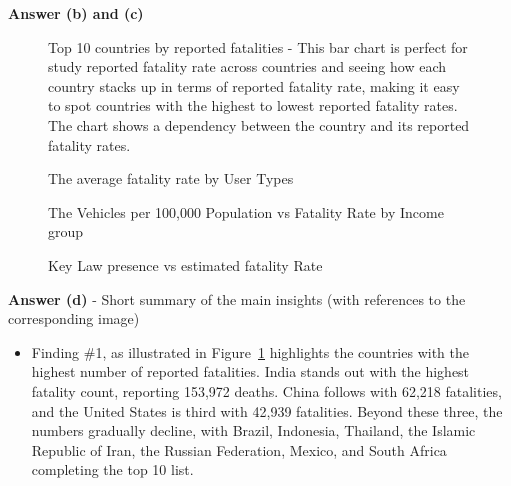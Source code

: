 \documentclass[a4paper,10pt]{article}\setlength{\textheight}{10in}\setlength{\textwidth}{6.5in}\setlength{\topmargin}{-0.125in}\setlength{\oddsidemargin}{-.2in}\setlength{\evensidemargin}{-.2in}\setlength{\headsep}{0.2in}\setlength{\footskip}{0pt}\usepackage{amsmath}\usepackage{fancyhdr}\usepackage{enumitem}\usepackage{hyperref}\usepackage{xcolor}\usepackage{graphicx}\usepackage[export]{adjustbox}\usepackage{caption}\usepackage{float}\usepackage{booktabs}\usepackage{makecell}\pagestyle{fancy}
\begin{document}
\begin{enumerate}[topsep=0mm, partopsep=0mm, leftmargin=*]
    
\textbf{Answer (b) and (c)}
    \begin{figure}[H]
        \centering
        \caption{Top 10 countries by reported fatalities - This bar chart is perfect for study reported fatality rate across countries and seeing how each country stacks up in terms of reported fatality rate, making it easy to spot countries with the highest to lowest reported fatality rates. The chart shows a dependency between the country and its reported fatality rates. }
        \label{fig:plot1}
    \end{figure}
    \begin{figure}[H]
        \centering
        \caption{The average fatality rate by User Types}
        \label{fig:plot2}
    \end{figure}
    \begin{figure}[H]
        \centering
        \caption{The Vehicles per 100,000 Population vs Fatality Rate by Income group}
        \label{fig:plot3}
    \end{figure}
    \begin{figure}[H]
        \centering
        \caption{Key Law presence vs estimated fatality Rate}
        \label{fig:plot4}
    \end{figure}

\textbf{Answer (d)} - Short summary of the main insights (with references to the corresponding image)
    \begin{itemize}
        \item Finding \#1, as illustrated in Figure~\ref{fig:plot1}  highlights the countries with the highest number of reported fatalities. India stands out with the highest fatality count, reporting 153,972 deaths. China follows with 62,218 fatalities, and the United States is third with 42,939 fatalities. Beyond these three, the numbers gradually decline, with Brazil, Indonesia, Thailand, the Islamic Republic of Iran, the Russian Federation, Mexico, and South Africa completing the top 10 list.
        

\end{itemize}
\end{enumerate}
\end{document}
